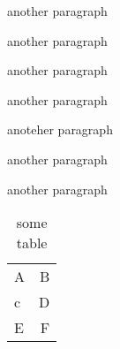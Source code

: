 \documentclass{report}
\begin{document}
\lipsum[1-4]

another paragraph

another paragraph

another paragraph

another paragraph

anoteher paragraph

another paragraph

another paragraph


\begin{longtable}{lr}
  \caption{some table}\\*
  \hline
  A&B\\
  c&D\\
  E&F
  \end{longtable}
\end{document}
